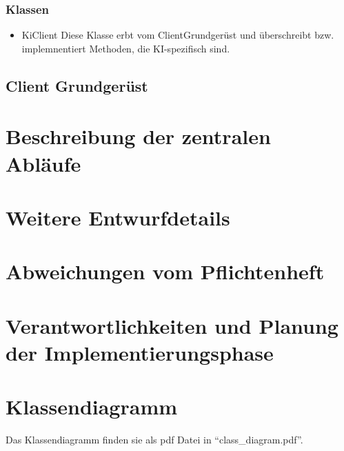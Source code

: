 \documentclass[a4paper,10pt]{article}
\begin{document}
\subsubsection{Klassen}
\begin{itemize}
\item KiClient
Diese Klasse erbt vom ClientGrundgerüst und überschreibt bzw. implemnentiert Methoden, die KI-spezifisch sind.
\end{itemize}
\subsection{Client Grundgerüst}
\section{Beschreibung der zentralen Abläufe}
\section{Weitere Entwurfdetails}
\section{Abweichungen vom Pflichtenheft}
\section{Verantwortlichkeiten und Planung der Implementierungsphase}
\section{Klassendiagramm}
Das Klassendiagramm finden sie als pdf Datei in "`class\_diagram.pdf"'.
\end{document}
